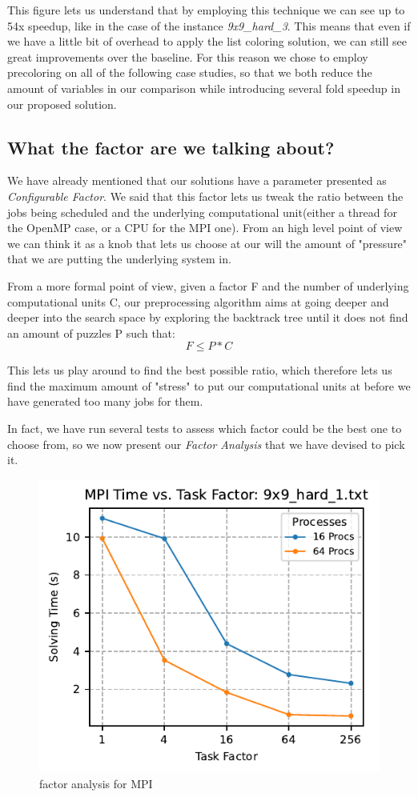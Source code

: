 This figure lets us understand that by employing this technique we can see up to 54x speedup, like in the case of the instance \textit{9x9\_hard\_3}. This means that even if we have a little bit of overhead to apply the list coloring solution, we can still see great improvements over the baseline. For this reason we chose to employ precoloring on all of the following case studies, so that we both reduce the amount of variables in our comparison while introducing several fold speedup in our proposed solution.

\subsection{What the factor are we talking about?}
We have already mentioned that our solutions have a parameter presented as \textit{Configurable Factor}. We said that this factor lets us tweak the ratio between the jobs being scheduled and the underlying computational unit(either a thread for the OpenMP case, or a CPU for the MPI one). From an high level point of view we can think it as a knob that lets us choose at our will the amount of "pressure" that we are putting the underlying system in.

From a more formal point of view, given a factor F and the number of underlying computational units C, our preprocessing algorithm aims at going deeper and deeper into the search space by exploring the backtrack tree until it does not find an amount of puzzles P such that:
\[
    F \leq P * C
\]

This lets us play around to find the best possible ratio, which therefore lets us find the maximum amount of "stress" to put our computational units at before we have generated too many jobs for them.

In fact, we have run several tests to assess which factor could be the best one to choose from, so we now present our \textit{Factor Analysis} that we have devised to pick it.


\begin{figure}[htbp]
\centering
\includegraphics[width=0.9\linewidth]{imgs/factor_analysis_mpi_9x9_hard_1.pdf}
\caption{factor analysis for MPI}
\label{fig:factor_analysis_mpi}
\end{figure}

